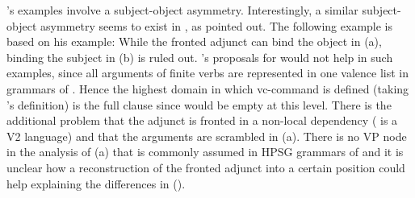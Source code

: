 \documentclass[output=paper
	        ,collection
	        ,collectionchapter
 	        ,biblatex
                ,babelshorthands
                ,newtxmath
                ,draftmode
                ,colorlinks, citecolor=brown
]{langscibook}
\begin{document}
\citeauthor{HL95b}'s examples involve a subject-object asymmetry. Interestingly, a similar
subject-object asymmetry seems to exist in , as \citet[]{Grewendorf85a} pointed
out. The following example is based on his example:
\eal
{}
\zl
While the fronted adjunct can bind the object in (a), binding the subject in (b) is
ruled out. \citeauthor{Walker2011a}'s proposals for  would not help in such examples, since all arguments of
finite verbs are represented in one valence list in grammars of . Hence the highest domain in
which vc-command is defined (taking \citeauthor{HL95b}'s definition) is the full clause since \comps
would be empty at this level. There is the additional problem that the adjunct is fronted in a
non-local dependency ( is a V2 language) and that the arguments are scrambled in
(a). There is no VP node in the analysis of (a) that is commonly assumed in HPSG
grammars of  and it is unclear how a reconstruction of the fronted adjunct into a certain
position could help explaining the differences in ().
\end{document}

